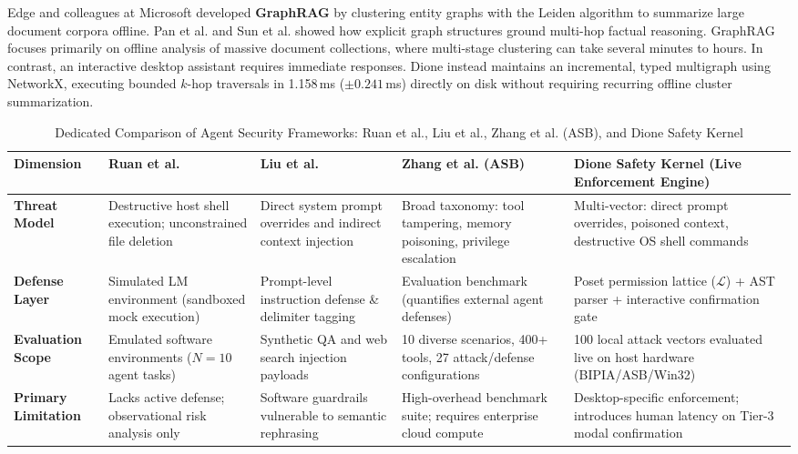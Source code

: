 \documentclass[conference,a4paper]{IEEEtran}
\begin{document}
Edge and colleagues at Microsoft developed \textbf{GraphRAG} \cite{edge2024graphrag} by clustering entity graphs with the Leiden algorithm to summarize large document corpora offline. Pan et al. \cite{pan2024unifying} and Sun et al. \cite{sun2023thinkongraph} showed how explicit graph structures ground multi-hop factual reasoning. GraphRAG focuses primarily on offline analysis of massive document collections, where multi-stage clustering can take several minutes to hours. In contrast, an interactive desktop assistant requires immediate responses. Dione instead maintains an incremental, typed multigraph using NetworkX, executing bounded $k$-hop traversals in 1.158\,ms ($\pm 0.241$\,ms) directly on disk without requiring recurring offline cluster summarization.

\begin{table}[!t]
\caption{Dedicated Comparison of Agent Security Frameworks: Ruan et al., Liu et al., Zhang et al. (ASB), and Dione Safety Kernel}
\label{tab:security_comparison}
\centering
\begin{tabularx}{\textwidth}{lXXXX}
\toprule
\textbf{Dimension} & \textbf{Ruan et al. \cite{ruan2023identifying}} & \textbf{Liu et al. \cite{liu2023prompt}} & \textbf{Zhang et al. (ASB) \cite{zhang2024agent}} & \textbf{Dione Safety Kernel (Live Enforcement Engine)} \\
\midrule
\textbf{Threat Model} & Destructive host shell execution; unconstrained file deletion & Direct system prompt overrides and indirect context injection & Broad taxonomy: tool tampering, memory poisoning, privilege escalation & Multi-vector: direct prompt overrides, poisoned context, destructive OS shell commands \\
\textbf{Defense Layer} & Simulated LM environment (sandboxed mock execution) & Prompt-level instruction defense \& delimiter tagging & Evaluation benchmark (quantifies external agent defenses) & Poset permission lattice ($\mathcal{L}$) + AST parser + interactive confirmation gate \\
\textbf{Evaluation Scope} & Emulated software environments ($N=10$ agent tasks) & Synthetic QA and web search injection payloads & 10 diverse scenarios, 400+ tools, 27 attack/defense configurations & 100 local attack vectors evaluated live on host hardware (BIPIA/ASB/Win32) \\
\textbf{Primary Limitation} & Lacks active defense; observational risk analysis only & Software guardrails vulnerable to semantic rephrasing & High-overhead benchmark suite; requires enterprise cloud compute & Desktop-specific enforcement; introduces human latency on Tier-3 modal confirmation \\
\bottomrule
\end{tabularx}
\end{table}
\end{document}
